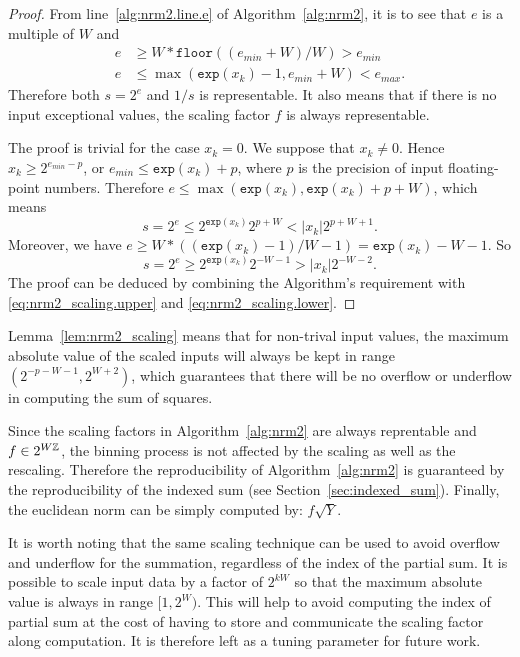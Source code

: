     \begin{proof}
         From line~\ref{alg:nrm2.line.e} of Algorithm~\ref{alg:nrm2}, it is to see that
         $e$ is a multiple of $W$ and
         \[
            \begin{aligned}
                e & \geq W * \texttt{floor}((e_{min} + W) / W) > e_{min} \\
                e & \leq \max(\texttt{exp}(x_k) - 1, e_{min} + W) < e_{max}.
            \end{aligned}
         \]
         Therefore both $s=2^e$ and $1/s$ is representable.
         It also means that if there is no input exceptional values, the scaling factor $f$ is always representable.

        The proof is trivial for the case $x_k = 0$. We suppose that $x_k \neq 0$.
        Hence $x_k \geq 2^{e_{min} - p}$, or $e_{min} \leq \texttt{exp}(x_k) + p$,
        where $p$ is the precision of input floating-point numbers.
        Therefore $e \leq \max(\texttt{exp}(x_k), \texttt{exp}(x_k) + p + W)$,
        which means
        \begin{equation}
            s = 2^e \leq 2^{\texttt{exp}(x_k)} 2^{p+W} < |x_k| 2^{p+W+1}.
            \label{eq:nrm2_scaling.upper}
        \end{equation}
        Moreover, we have
        \(
            e \geq W * ((\texttt{exp}(x_k) -  1) / W - 1) = \texttt{exp}(x_k) - W -1.
        \)
        So 
        \begin{equation}
            s = 2^e \geq 2^{\texttt{exp}(x_k)} 2^{- W - 1} > |x_k| 2^{-W-2}.
            \label{eq:nrm2_scaling.lower}
        \end{equation}
        The proof can be deduced by combining the Algorithm's requirement
        with \eqref{eq:nrm2_scaling.upper} and \eqref{eq:nrm2_scaling.lower}.
    \end{proof}

    Lemma~\ref{lem:nrm2_scaling} means that 
    for non-trival input values, the maximum absolute value of the scaled inputs
    will always be kept in range $(2^{-p-W-1}, 2^{W+2})$, which guarantees that
    there will be no overflow or underflow in computing the sum of squares.

    Since the scaling factors in Algorithm~\ref{alg:nrm2} are always reprentable and $f \in 2^{W\mathbb{Z}}$,
    the binning process is not affected by the scaling as well as the rescaling.
    Therefore the reproducibility of Algorithm~\ref{alg:nrm2} is guaranteed
    by the reproducibility of the indexed sum (see Section~\ref{sec:indexed_sum}).
    Finally, the euclidean norm can be simply computed by: $f \sqrt{Y}$.

    It is worth noting that the same scaling technique can be used to avoid
    overflow and underflow for the summation, regardless of the index of the partial sum.
    It is possible to scale input data by a factor of $2^{kW}$ so that the maximum
    absolute value is always in range $[1,2^W)$.
    This will help to avoid computing the index of partial sum
    at the cost of having to store and communicate the scaling factor along computation.
    It is therefore left as a tuning parameter for future work.

